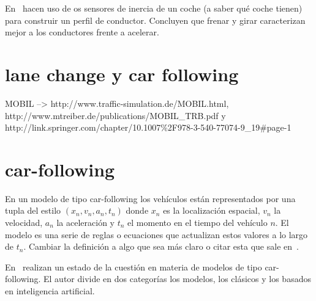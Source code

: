 En~\cite{van2013driver} hacen uso de os sensores de inercia de un coche (a saber qué coche tienen) para construir un perfil de conductor. Concluyen que frenar y girar caracterizan mejor a los conductores frente a acelerar.

\section{lane change y car following}

MOBIL --> http://www.traffic-simulation.de/MOBIL.html, http://www.mtreiber.de/publications/MOBIL\_TRB.pdf y http://link.springer.com/chapter/10.1007\%2F978-3-540-77074-9\_19\#page-1

\section{car-following}

En un modelo de tipo car-following los vehículos están representados por una tupla del estilo $(x_n, v_n, a_n, t_n)$ donde $x_n$ es la localización espacial, $v_n$ la velocidad, $a_n$ la aceleración y $t_n$ el momento en el tiempo del vehículo $n$. El modelo es una serie de reglas o ecuaciones que actualizan estos valores a lo largo de $t_n$. Cambiar la definición a algo que sea más claro o citar esta que sale en~\cite{Aghabayk2015}.

En~\cite{Aghabayk2015} realizan un estado de la cuestión en materia de modelos de tipo car-following. El autor divide en dos categorías los modelos, los clásicos y los basados en inteligencia artificial.

